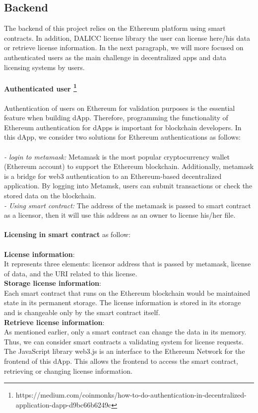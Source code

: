 \subsection{Backend} The backend of this project relies on the Ethereum platform using smart contracts. In addition, DALICC license library the user can license here/his data or retrieve license information. In the next paragraph, we will more focused on authenticated users as the main challenge in decentralized apps and data licensing systems by users. \\
\\
\textbf{Authenticated user \footnote{https://medium.com/coinmonks/how-to-do-authentication-in-decentralized-application-dapp-d9bc66b6249c}} \\
\\
Authentication of users on Ethereum for validation purposes is the essential feature when building dApp.  Therefore, programming the functionality of Ethereum authentication for dApps is important for blockchain developers. 
In this dApp, we consider two solutions for Ethereum authentications as follows: \\
\\
\textit{- login to metamask:} Metamask is the most popular cryptocurrency wallet (Ethereum account) to support the Ethereum blockchain. Additionally, metamask is a bridge for web3 authentication to an Ethereum-based decentralized application. By logging into Metamsk, users can submit transactions or check the stored data on the blockchain.\\
\textit{- Using smart contract: } The address of the metamask is passed to smart contract as a licensor, then it will
use this address as an owner to license his/her file. \\
\\
\textbf{Licensing in smart contract} as follow: \\
\\
\textbf{License information}:\\ It represents three elements: licensor address that is passed by metamask, license of data, and the URI related to this license.\\
\textbf{Storage license information}: \\Each smart contract that runs on the Ethereum blockchain would be maintained state in its permanent storage. The license information is stored in its storage and is changeable only by the smart contract itself.\\
\textbf{Retrieve license information}: \\As mentioned earlier, only a smart contract can change the data in its memory. Thus, we can consider smart contracts a validating system for license requests. The JavaScript
library web3.js is an interface to the Ethereum Network for the frontend of this dApp. This allows the frontend to access the smart contract, retrieving or changing license information.\\

